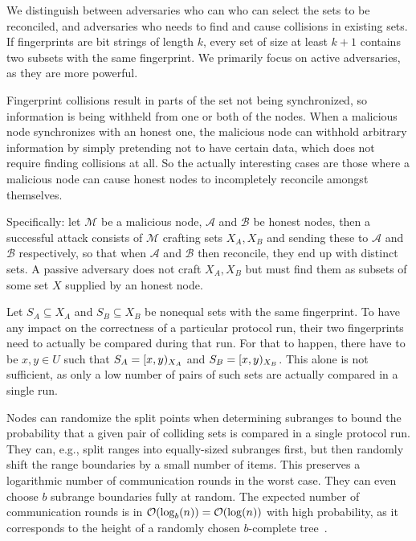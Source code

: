 \documentclass[conference]{IEEEtran}
\begin{document}
We distinguish between  adversaries who can who can select the sets to be reconciled, and  adversaries who needs to find and cause collisions in existing sets. If fingerprints are bit strings of length $k$, every set of size at least $k + 1$ contains two subsets with the same fingerprint. We primarily focus on active adversaries, as they are more powerful.

Fingerprint collisions result in parts of the set not being synchronized, so information is being withheld from one or both of the nodes. When a malicious node synchronizes with an honest one, the malicious node can withhold arbitrary information by simply pretending not to have certain data, which does not require finding collisions at all. So the actually interesting cases are those where a malicious node can cause honest nodes to incompletely reconcile amongst themselves.

Specifically: let $\mathcal{M}$ be a malicious node, $\mathcal{A}$ and $\mathcal{B}$ be honest nodes, then a successful attack consists of $\mathcal{M}$ crafting sets $X_A, X_B$ and sending these to $\mathcal{A}$ and $\mathcal{B}$ respectively, so that when $\mathcal{A}$ and $\mathcal{B}$ then reconcile, they end up with distinct sets. A passive adversary does not craft $X_A, X_B$ but must find them as subsets of some set $X$ supplied by an honest node.

Let $S_A \subseteq X_A$ and $S_B \subseteq X_B$ be nonequal sets with the same fingerprint. To have any impact on the correctness of a particular protocol run, their two fingerprints need to actually be compared during that run. For that to happen, there have to be $x, y \in U$ such that $S_A = [{x},{y})_{X_A}$ and $S_B = [{x},{y})_{X_B}$. This alone is not sufficient, as only a low number of pairs of such sets are actually compared in a single run.

Nodes can randomize the split points when determining subranges to bound the probability that a given pair of colliding sets is compared in a single protocol run. They can, e.g., split ranges into equally-sized subranges first, but then randomly shift the range boundaries by a small number of items. This preserves a logarithmic number of communication rounds in the worst case. They can even choose $b$ subrange boundaries fully at random. The expected number of communication rounds is in $\mathcal{O}(\log_b(n)) = \mathcal{O}(\log(n))$ with high probability, as it corresponds to the height of a randomly chosen $b$-complete tree~\cite{devroye1990height}.
\end{document}
